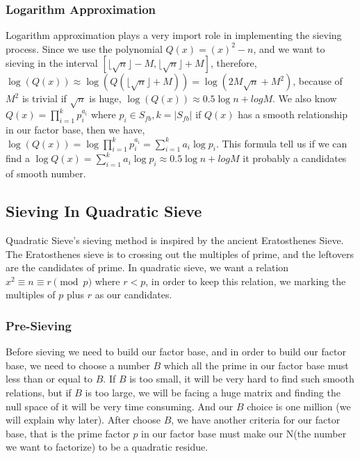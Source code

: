 \documentclass[12pt]{article} %
\begin{document}
\subsubsection{Logarithm Approximation}

Logarithm approximation plays a very import role in implementing the sieving process.
Since we use the polynomial $Q(x) = (x)^2-n$, and we want to sieving in the interval  $[\lfloor \sqrt{n} \rfloor - M, \lfloor \sqrt{n} \rfloor + M]$, therefore, $\log{(Q(x))} \approx \log{(Q(\lfloor \sqrt{n} \rfloor + M))} = \log{(2M\sqrt{n}+M^2)}$, because of $M^2$ is trivial if $\sqrt{n}$ is huge, $\log{(Q(x))} \approx 0.5\log{n} + log{M}$. We also know $Q(x) = \prod_{i=1}^k{p_i^{a_i}}$ where $p_i \in S_{fb}, k=|S_{fb}|$ if $Q(x)$ has a smooth relationship in our factor base, then we have,  $\log{(Q(x))} = \log{\prod_{i=1}^k{p_i^{a_i}}} = \sum_{i=1}^k{a_i\log{p_i}}$. This formula tell us if we can find a $\log{Q(x)} = \sum_{i=1}^k{a_i\log{p_i}} \approx 0.5\log{n} + log{M}$ it probably a candidates of smooth number.

\subsection {Sieving In Quadratic Sieve}

Quadratic Sieve's sieving method is inspired by the ancient Eratosthenes Sieve. The Eratosthenes sieve is to crossing out the multiples of prime, and the leftovers are the candidates of prime. In quadratic sieve, we want a relation $x^2 \equiv n \equiv r \pmod{p}$ where $r < p$, in order to keep this relation, we marking the multiples of $p$ plus $r$ as our candidates. 

\subsubsection {Pre-Sieving}

Before sieving we need to build our factor base, and in order to build our factor base, we need to choose a number $B$ which all the prime in our factor base must less than or equal to $B$. If $B$ is too small, it will be very hard to find such smooth relations, but if $B$ is too large, we will be facing a huge matrix and finding the null space of it will be very time consuming. And our $B$ choice is one million (we will explain why later). After choose $B$, we have another criteria for our factor base, that is the prime factor $p$ in our factor base must make our N(the number we want to factorize) to be a quadratic residue.
\end{document}
